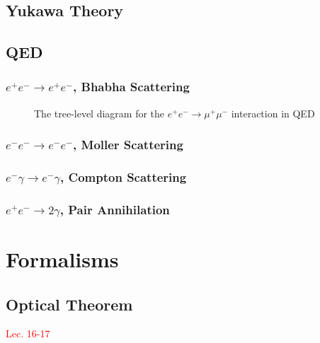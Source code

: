 \documentclass{article}
\begin{document}
\subsection{Yukawa Theory}

\subsection{QED}

\subsubsection{$e^+e^-\to e^+e^-$, Bhabha Scattering}

\begin{figure}[h]
    \centering
    \resizebox{.25\linewidth}{!}
    {
    \begin{feynman}
    \end{feynman}        
    }
  \caption{The tree-level diagram for the $e^+e^-\to\mu^+\mu^-$ interaction in QED}
\end{figure}

\subsubsection{$e^-e^-\to e^-e^-$, Moller Scattering}

\subsubsection{$e^-\gamma\to e^-\gamma$, Compton Scattering}

\subsubsection{$e^+e^-\to 2\gamma$, Pair Annihilation}

\pagebreak

\section{Formalisms}

\subsection{Optical Theorem}
\textcolor{red}{Lec. 16-17}
\end{document}
